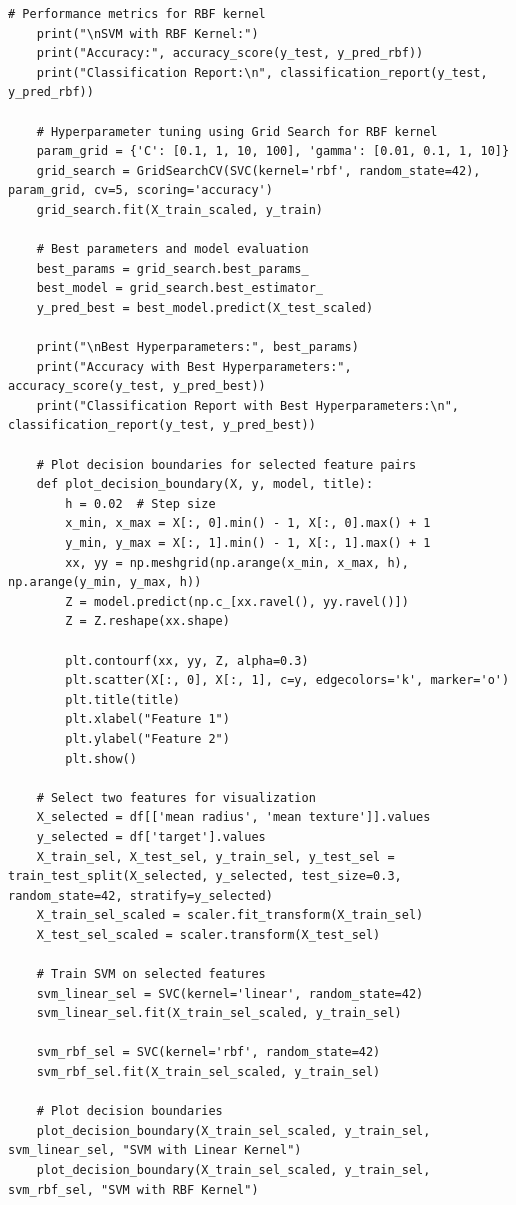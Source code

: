 \documentclass[a4paper,12pt]{article}
\begin{document}
\begin{lstlisting}[style=python]
    # Performance metrics for RBF kernel
    print("\nSVM with RBF Kernel:")
    print("Accuracy:", accuracy_score(y_test, y_pred_rbf))
    print("Classification Report:\n", classification_report(y_test, y_pred_rbf))
    
    # Hyperparameter tuning using Grid Search for RBF kernel
    param_grid = {'C': [0.1, 1, 10, 100], 'gamma': [0.01, 0.1, 1, 10]}
    grid_search = GridSearchCV(SVC(kernel='rbf', random_state=42), param_grid, cv=5, scoring='accuracy')
    grid_search.fit(X_train_scaled, y_train)
    
    # Best parameters and model evaluation
    best_params = grid_search.best_params_
    best_model = grid_search.best_estimator_
    y_pred_best = best_model.predict(X_test_scaled)
    
    print("\nBest Hyperparameters:", best_params)
    print("Accuracy with Best Hyperparameters:", accuracy_score(y_test, y_pred_best))
    print("Classification Report with Best Hyperparameters:\n", classification_report(y_test, y_pred_best))
    
    # Plot decision boundaries for selected feature pairs
    def plot_decision_boundary(X, y, model, title):
        h = 0.02  # Step size
        x_min, x_max = X[:, 0].min() - 1, X[:, 0].max() + 1
        y_min, y_max = X[:, 1].min() - 1, X[:, 1].max() + 1
        xx, yy = np.meshgrid(np.arange(x_min, x_max, h), np.arange(y_min, y_max, h))
        Z = model.predict(np.c_[xx.ravel(), yy.ravel()])
        Z = Z.reshape(xx.shape)
    
        plt.contourf(xx, yy, Z, alpha=0.3)
        plt.scatter(X[:, 0], X[:, 1], c=y, edgecolors='k', marker='o')
        plt.title(title)
        plt.xlabel("Feature 1")
        plt.ylabel("Feature 2")
        plt.show()
    
    # Select two features for visualization
    X_selected = df[['mean radius', 'mean texture']].values
    y_selected = df['target'].values
    X_train_sel, X_test_sel, y_train_sel, y_test_sel = train_test_split(X_selected, y_selected, test_size=0.3, random_state=42, stratify=y_selected)
    X_train_sel_scaled = scaler.fit_transform(X_train_sel)
    X_test_sel_scaled = scaler.transform(X_test_sel)
    
    # Train SVM on selected features
    svm_linear_sel = SVC(kernel='linear', random_state=42)
    svm_linear_sel.fit(X_train_sel_scaled, y_train_sel)
    
    svm_rbf_sel = SVC(kernel='rbf', random_state=42)
    svm_rbf_sel.fit(X_train_sel_scaled, y_train_sel)
    
    # Plot decision boundaries
    plot_decision_boundary(X_train_sel_scaled, y_train_sel, svm_linear_sel, "SVM with Linear Kernel")
    plot_decision_boundary(X_train_sel_scaled, y_train_sel, svm_rbf_sel, "SVM with RBF Kernel")
    
\end{lstlisting}
\end{document}

